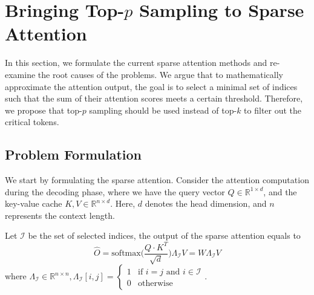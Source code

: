 \section{Bringing Top-$p$ Sampling to Sparse Attention\label{sec:top_p}}

In this section, we formulate the current sparse attention methods and re-examine the root causes of the problems. We argue that to mathematically approximate the attention output, the goal is to select a minimal set of indices such that the sum of their attention scores meets a certain threshold. Therefore, we propose that top-$p$ sampling should be used instead of top-$k$ to filter out the critical tokens.

\subsection{Problem Formulation\label{sec:formulate}}

We start by formulating the sparse attention. Consider the attention computation during the decoding phase, where we have the query vector $Q \in \mathbb{R}^{1 \times d}$, and the key-value cache $K, V \in \mathbb{R}^{n \times d}$. Here, $d$ denotes the head dimension, and $n$ represents the context length. 
\begin{definition}
Let $\mathcal{I}$ be the set of selected indices, the output of the sparse attention equals to
\begin{equation}
    \hat{O} = \text{softmax} \bigg( \frac{Q \cdot K^T}{\sqrt{d}} \bigg) \Lambda_{\mathcal{I}} V = W \Lambda_{\mathcal{I}} V
\end{equation}
where $\Lambda_{\mathcal{I}} \in \mathbb{R}^{n \times n},
    \Lambda_{\mathcal{I}}[i, j] = 
    \begin{cases}
    1 & \text{if } i=j \text{ and } i \in \mathcal{I} \\
    0 & \text{otherwise}
    \end{cases}
$.
\end{definition}

